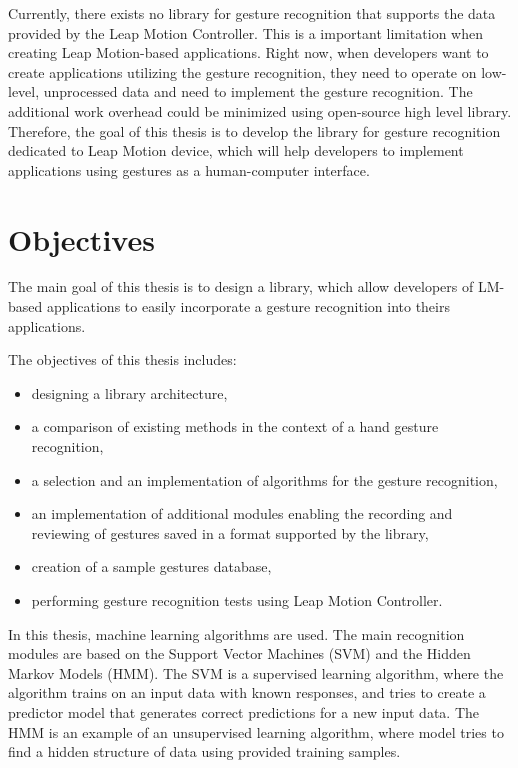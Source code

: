 Currently, there exists no library for gesture recognition that supports the data provided by the Leap Motion Controller.
This is a important limitation when creating Leap Motion-based applications.
Right now, when developers want to create applications utilizing the gesture recognition, they need to operate on low-level, unprocessed data and need to implement the gesture recognition.
The additional work overhead could be minimized using open-source high level library.
Therefore, the goal of this thesis is to develop the library for gesture recognition dedicated to Leap Motion device, which will help developers to implement applications using gestures as a human-computer interface.


\section{Objectives}

The main goal of this thesis is to design a library, which allow developers of LM-based applications to easily incorporate a gesture recognition into theirs applications.

The objectives of this thesis includes:
\begin{itemize}
\item designing a library architecture, 
\item a comparison of existing methods in the context of a hand gesture recognition,
\item a selection and an implementation of algorithms for the gesture recognition,
\item an implementation of additional modules enabling the recording and reviewing of gestures saved in a format supported by the library,
\item creation of a sample gestures database,
\item performing gesture recognition tests using Leap Motion Controller.
\end{itemize}


In this thesis, machine learning algorithms are used. 
The main recognition modules are based on the Support Vector Machines (SVM) and the Hidden Markov Models (HMM). 
The SVM is a supervised learning algorithm, where the algorithm trains on an input data with known responses, and tries to create a predictor model that generates correct predictions for a new input data.
The HMM is an example of an unsupervised learning algorithm, where model tries to find a hidden structure of data using provided training samples. 

